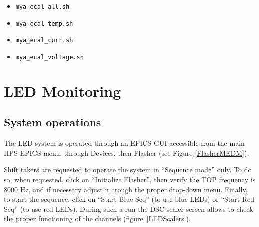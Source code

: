 \documentclass[12pt]{article}
\begin{document}
      \begin{itemize}
          \item \texttt{mya\_ecal\_all.sh}
          \item \texttt{mya\_ecal\_temp.sh}
          \item \texttt{mya\_ecal\_curr.sh}
          \item \texttt{mya\_ecal\_voltage.sh}
      \end{itemize}

   \section{LED Monitoring}

      \subsection{System operations}
      
      The LED system is operated through an EPICS GUI accessible from the main HPS EPICS menu, through Devices, then Flasher (see Figure \ref{FlasherMEDM}).

Shift takers are requested to operate the system in ``Sequence mode'' only. To do so, when requested, click on ``Initialize Flasher'', then verify the TOP frequency is 8000 Hz, and if necessary adjust it trough the proper drop-down menu. Finally, to start the sequence, click on ``Start Blue Seq'' (to use blue LEDs) or ``Start Red Seq'' (to use red LEDs). During such a run the DSC scaler screen allows to check the proper functioning of the channels (figure~\ref{LEDScalers}). 
\end{document}
